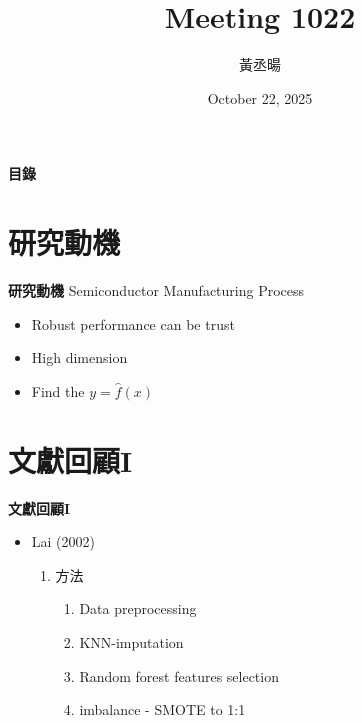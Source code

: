 \documentclass[12pt,aspectratio=43]{beamer}
\title{Meeting 1022}
\author{黃丞暘}
\institute{國立東華大學應數統計所}
\date{October 22, 2025}
\begin{document}
\begin{frame}
  \titlepage
\end{frame}

\begin{frame}{\textbf{目錄}}
  \tableofcontents
\end{frame}

\section{研究動機}

\begin{frame}[<+>]{\textbf{研究動機}}
\linespread{1.5}
  Semiconductor Manufacturing Process
  \begin{itemize}
    \item Robust performance can be trust
  \end{itemize}
  \begin{itemize}
    \item High dimension
  \end{itemize}
  \begin{itemize}
    \item Find the $y = \hat{f}(x)$
  \end{itemize}
\end{frame}

\section{文獻回顧I}

\begin{frame}[<+>]{\textbf{文獻回顧I}}
\linespread{1.5}
  \begin{itemize}[]
    \item Lai (2002)
    \begin{enumerate}[]
      \item 方法
      \begin{enumerate}
        \item Data preprocessing
        \item KNN-imputation
        \item Random forest features selection
        \item imbalance - SMOTE to 1:1
      \end{enumerate}
    \end{enumerate}
  \end{itemize}
\end{frame}
\end{document}
